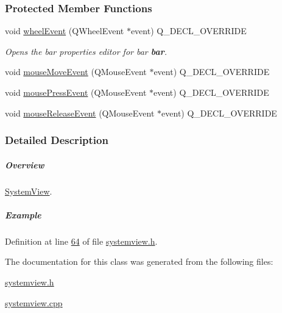 \subsubsection*{Protected Member Functions}
\begin{DoxyCompactItemize}
\item 
void \hyperlink{group___graphics_gaab2fa6cebf9022eb6bf31497c0789675}{wheel\+Event} (Q\+Wheel\+Event $\ast$event) Q\+\_\+\+D\+E\+C\+L\+\_\+\+O\+V\+E\+R\+R\+I\+D\+E
\begin{DoxyCompactList}\small\item\em Opens the bar properties editor for bar {\bfseries bar}. \end{DoxyCompactList}\item 
void \hyperlink{group___graphics_gab19e233cd697852dd71140971cb6e122}{mouse\+Move\+Event} (Q\+Mouse\+Event $\ast$event) Q\+\_\+\+D\+E\+C\+L\+\_\+\+O\+V\+E\+R\+R\+I\+D\+E
\item 
void \hyperlink{group___graphics_ga42d4a485d6d9bd891d9505a5213cf783}{mouse\+Press\+Event} (Q\+Mouse\+Event $\ast$event) Q\+\_\+\+D\+E\+C\+L\+\_\+\+O\+V\+E\+R\+R\+I\+D\+E
\item 
void \hyperlink{group___graphics_gaa8a2664405194bbe29daa454aead7416}{mouse\+Release\+Event} (Q\+Mouse\+Event $\ast$event) Q\+\_\+\+D\+E\+C\+L\+\_\+\+O\+V\+E\+R\+R\+I\+D\+E
\end{DoxyCompactItemize}


\subsubsection{Detailed Description}
\subparagraph*{Overview}

\hyperlink{class_system_view}{System\+View}.

\subparagraph*{Example}


\begin{DoxyCode}
\end{DoxyCode}
 

Definition at line \hyperlink{systemview_8h_source_l00064}{64} of file \hyperlink{systemview_8h_source}{systemview.\+h}.



The documentation for this class was generated from the following files\+:\begin{DoxyCompactItemize}
\item 
\hyperlink{systemview_8h}{systemview.\+h}\item 
\hyperlink{systemview_8cpp}{systemview.\+cpp}\end{DoxyCompactItemize}
